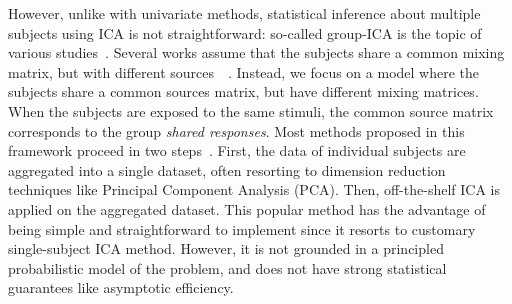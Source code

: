%
%
However, unlike with univariate methods, statistical inference about multiple subjects using ICA is not straightforward: so-called group-ICA is the topic of various studies~\cite{hyvarinen2013independent}.
%
Several works assume that the subjects share a common mixing matrix, but with different sources~\cite{pfister2019robustifying}~\cite{svensen2002ica}.
%
Instead, we focus on a model where the subjects share a common sources matrix, but have different mixing matrices.
%
When the subjects are exposed to the same stimuli, the common source matrix corresponds to the group \emph{shared responses}.
%
Most methods proposed in this framework proceed in two steps~\cite{calhoun2009review, huster2015group}.
%
First, the data of individual subjects are aggregated into a single dataset, often resorting to dimension reduction techniques like Principal Component Analysis (PCA).
%
Then, off-the-shelf ICA is applied on the aggregated dataset.
%
This popular method has the advantage of being simple and
straightforward to implement since it resorts to customary single-subject
ICA method.
%
However, it is not grounded in a principled probabilistic model of the problem, and does not have strong statistical guarantees like asymptotic efficiency. %
%
%
%

